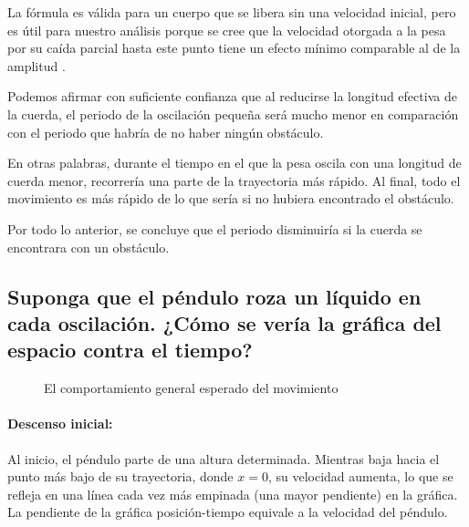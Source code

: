\documentclass[twocolumn]{article}
\numberwithin{table}{section}
\begin{document}
La fórmula es válida para un cuerpo que se libera sin una velocidad
inicial, pero es útil para nuestro análisis porque se cree que la velocidad
otorgada a la pesa por su caída parcial hasta este punto tiene un
efecto mínimo comparable al de la amplitud \alpha.

Podemos afirmar con suficiente confianza que al reducirse la longitud
efectiva de la cuerda, el periodo de la oscilación pequeña será mucho
menor en comparación con el periodo que habría de no haber ningún obstáculo.

En otras palabras, durante el tiempo en el que la pesa oscila con
una longitud de cuerda menor, recorrería una parte de la trayectoria
más rápido. Al final, todo el movimiento es más rápido de lo que
sería si no hubiera encontrado el obstáculo.

Por todo lo anterior, se concluye que el periodo disminuiría si la
cuerda se encontrara con un obstáculo.

\subsection*{Suponga que el péndulo roza un líquido en cada
oscilación. ¿Cómo se vería la gráfica del espacio contra el tiempo?}

\begin{figure}[ht]
  \centering
  \caption{El comportamiento general esperado del
  movimiento}\label{fig:líquido}
\end{figure}

\paragraph{Descenso inicial:} Al inicio, el péndulo
parte de una altura determinada. Mientras baja hacia el punto más
bajo de su trayectoria, donde $x=0$, su velocidad aumenta, lo que se
refleja en una línea cada vez más empinada (una mayor pendiente)
en la gráfica. La pendiente de la gráfica posición-tiempo equivale a la
velocidad del péndulo.
\end{document}
